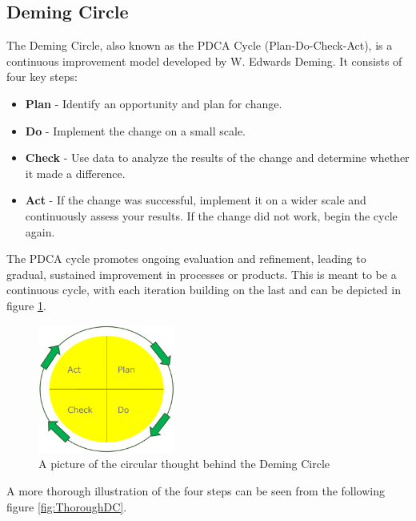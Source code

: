 \subsection{Deming Circle}
The Deming Circle, also known as the PDCA Cycle (Plan-Do-Check-Act), is a continuous improvement model developed by W. Edwards Deming. It consists of four key steps:

\begin{highlight}
    \begin{itemize}
        \item \textbf{Plan} - Identify an opportunity and plan for change.
        \item \textbf{Do} - Implement the change on a small scale.
        \item \textbf{Check} - Use data to analyze the results of the change and determine whether it made a difference.
        \item \textbf{Act} - If the change was successful, implement it on a wider scale and continuously assess your results. If the change did not work, begin the cycle again.
    \end{itemize}
\end{highlight}

The PDCA cycle promotes ongoing evaluation and refinement, leading to gradual, sustained improvement in processes or products. This is meant to be a continuous cycle, with each iteration building on the last and can be depicted in figure \ref{fig:demingcircle}.

\begin{figure}[h]
    \centering
    \includegraphics[width=0.4\textwidth]{Figures/DemingCircle.png}
    \caption{A picture of the circular thought behind the Deming Circle}
    \label{fig:demingcircle}
\end{figure}

A more thorough illustration of the four steps can be seen from the following figure \ref{fig:ThoroughDC}.

